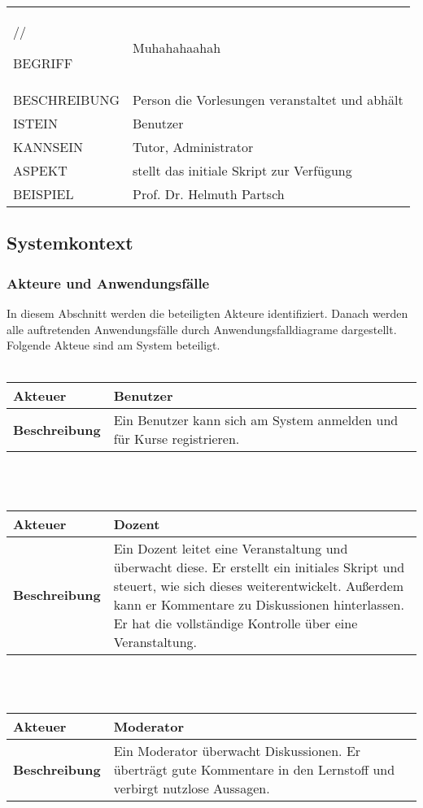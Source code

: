 \documentclass[12pt,a4paper]{article}
\begin{document}
\begin{tabular}{l p{10cm}}
//

BEGRIFF 	 & Muhahahaahah \\ 
BESCHREIBUNG & Person die Vorlesungen veranstaltet und abhält \\ 
ISTEIN   	 & Benutzer\\
KANNSEIN 	 & Tutor, Administrator \\ 
ASPEKT   	 & stellt das initiale Skript zur Verfügung\\
BEISPIEL 	 & Prof. Dr. Helmuth Partsch\\
\hline

\end{tabular}


\subsection{Systemkontext}
\subsubsection{Akteure und Anwendungsfälle}
In diesem Abschnitt werden die beteiligten Akteure identifiziert. Danach werden alle auftretenden Anwendungsfälle durch Anwendungsfalldiagrame dargestellt.
Folgende Akteue sind am System beteiligt.\\\\

\begin{tabular}{l p{10cm}}
\textbf{Akteuer} & Benutzer \\ 
\hline \textbf{Beschreibung} & Ein Benutzer kann sich am System anmelden und für Kurse registrieren. \\ 
\hline 
\end{tabular}\\\\

\begin{tabular}{l p{10cm}}
\textbf{Akteuer} & Dozent \\ 
\hline \textbf{Beschreibung} & Ein Dozent leitet eine Veranstaltung und überwacht diese. Er erstellt ein initiales Skript und steuert, wie sich dieses weiterentwickelt. Außerdem kann er Kommentare zu Diskussionen hinterlassen. Er hat die vollständige Kontrolle über eine Veranstaltung.\\ 
\hline 
\end{tabular}\\\\

\begin{tabular}{l p{10cm}}
\textbf{Akteuer} & Moderator \\ 
\hline \textbf{Beschreibung} & Ein Moderator überwacht Diskussionen. Er überträgt gute Kommentare in den Lernstoff und verbirgt nutzlose Aussagen.\\ 
\hline 
\end{tabular}\\\\
\end{document}
